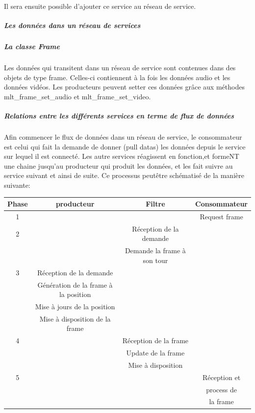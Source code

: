 Il sera ensuite possible d'ajouter ce service au réseau de service.

\subparagraph{Les données dans un réseau de services}

\subparagraph{La classe Frame}

\subparagraph{}

Les données qui transitent dans un réseau de service sont contenues dans
des objets de type frame. Celles-ci contiennent à la fois les données
audio et les données vidéos. Les producteurs peuvent setter ces données
grâce aux méthodes mlt\_frame\_set\_audio et mlt\_frame\_set\_video.

\subparagraph{Relations entre les différents services en terme de flux
de données}

Afin commencer le flux de données dans un réseau de service, le
consommateur est celui qui fait la demande de donner (pull datas)
les données depuis le service sur lequel il est connecté. Les autre
services réagissent en fonction,et formeNT une chaine jusqu'au
producteur qui produit les données, et les fait suivre au service
suivant et ainsi de suite. Ce processus peutêtre schématisé de
la manière suivante:

\begin{center}

  \begin{tabular}{ | c | c | c | c |}

    \hline

Phase & producteur & Filtre & Consommateur    \\ \hline \hline

1 & & & Request frame   \\ \hline

2 & & Réception de la demande & \\

  & & Demande la frame à son tour & \\ \hline


3 & Réception de la demande & & \\

  & Génération de la frame à la position & & \\

  & Mise à jours de la position & & \\

  & Mise à disposition de la frame & & \\ \hline

4 & & Réception de la frame       & \\

  & & Update de la frame & \\

  & & Mise à disposition & \\ \hline

5 & & & Réception et    \\

  & & & process de      \\

  & & & la frame        \\ \hline

  \end{tabular}

\end{center}

